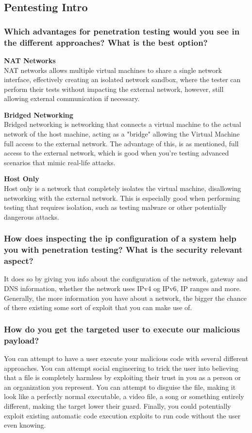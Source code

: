 \subsection{Pentesting Intro}
\subsubsection{Which advantages for penetration testing would you see in the different approaches? What is the best option?}

\textbf{NAT Networks}\\
NAT networks allows multiple virtual machines to share a single network interface, effectively creating an isolated network sandbox, where the tester can perform their tests without impacting the external network, however, still allowing external communication if necessary.

\textbf{Bridged Networking}\\
Bridged networking is networking that connects a virtual machine to the actual network of the host machine, acting as a "bridge" allowing the Virtual Machine full access to the external network. The advantage of this, is as mentioned, full access to the external network, which is good when you're testing advanced scenarios that mimic real-life attacks.

\textbf{Host Only}\\
Host only is a network that completely isolates the virtual machine, disallowing networking with the external network. This is especially good when performing testing that requires isolation, such as testing malware or other potentially dangerous attacks.

\subsubsection{How does inspecting the ip configuration of a system help you with penetration testing? What is the security relevant aspect?}
It does so by giving you info about the configuration of the network, gateway and DNS information, whether the network uses IPv4 og IPv6, IP ranges and more. Generally, the more information you have about a network, the bigger the chance of there existing some sort of exploit that you can make use of.

\subsubsection{How do you get the targeted user to execute our malicious payload?}
You can attempt to have a user execute your malicious code with several different approaches. You can attempt social engineering to trick the user into believing that a file is completely harmless by exploiting their trust in you as a person or an organization you represent. You can attempt to disguise the file, making it look like a perfectly normal executable, a video file, a song or something entirely different, making the target lower their guard. Finally, you could potentially exploit existing automatic code execution exploits to run code without the user even knowing.

